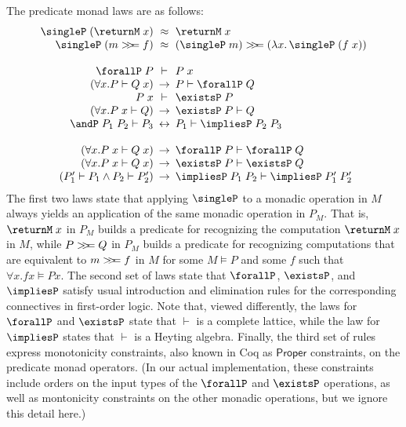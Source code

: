 \documentclass[preprint]{sigplanconf}
\begin{document}
The predicate monad laws are as follows:
\[
\begin{array}{@{}r@{\hspace{5pt}}c@{\hspace{5pt}}l@{}}
  \singleP\;(\returnM\;x) & \approx & \returnM\;x\\
  \singleP\;(m \bind f) & \approx
  & (\singleP\;m)\bind (\lamabsnot{x}{\singleP\;(f\;x)})
  \\ \\
  \forallP\;P & \vdash & P\;x\\
  (\forall x. P \vdash Q\;x) & \to & P \vdash \forallP\;Q\\
  P\;x & \vdash & \existsP\;P\\
  (\forall x. P\;x \vdash Q) & \to & \existsP\;P \vdash Q\\
  \andP\;P_1\;P_2 \vdash P_3 & \leftrightarrow & P_1 \vdash \impliesP\;P_2\;P_3
  \\ \\
  (\forall x. P\;x \vdash Q\;x) & \to & \forallP\;P \vdash \forallP\;Q\\
  (\forall x. P\;x \vdash Q\;x) & \to & \existsP\;P \vdash \existsP\;Q\\
  (P_1'\vdash P_1 \wedge P_2\vdash P_2') & \to
  & \impliesP\;P_1\;P_2 \vdash \impliesP\;P_1'\;P_2'
\end{array}
\]
The first two laws state that applying $\singleP$ to a monadic operation in $M$
always yields an application of the same monadic operation in $P_M$. That is,
$\returnM\;x$ in $P_M$ builds a predicate for recognizing the computation
$\returnM\;x$ in $M$, while $P>\!\!>\!\!= Q$ in $P_M$ builds a predicate for
recognizing computations that are equivalent to $m>\!\!>\!\!= f$ in $M$ for some
$M\vDash P$ and some $f$ such that $\forall x.f x \vDash P x$.
%
The second set of laws state that $\forallP$, $\existsP$, and $\impliesP$
satisfy usual introduction and elimination rules for the corresponding
connectives in first-order logic. Note that, viewed differently, the laws for
$\forallP$ and $\existsP$ state that $\vdash$ is a complete lattice, while the
law for $\impliesP$ states that $\vdash$ is a Heyting algebra.
%
Finally, the third set of rules express monotonicity constraints, also known in
Coq as $\mathsf{Proper}$ constraints, on the predicate monad operators. (In our
actual implementation, these constraints include orders on the input types of
the $\forallP$ and $\existsP$ operations, as well as montonicity constraints on
the other monadic operations, but we ignore this detail here.)
\end{document}
